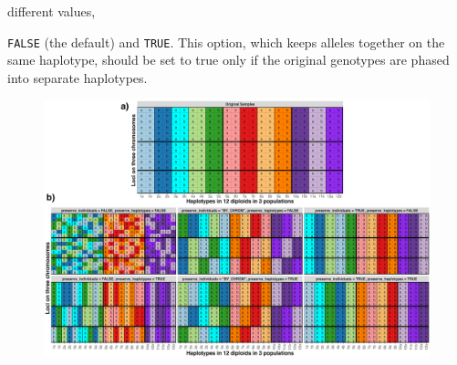 different values, {{\tt\footnotesize FALSE} (the default) and {\tt\footnotesize TRUE}. 
This option, which keeps alleles together
on the same haplotype, should be set to true only
if the original genotypes are phased into separate haplotypes.

\newcommand{\permcap}{\footnotesize An illustration of how \gscramble{} permutes data under
different options.  {\bf (a)}~A picture
representing an original data set of $N=12$ diploids sampled from three populations and typed at $L=15$ markers.
Different colors represent different sampled individuals. Individuals 1--5 are shades of blue and green, indicating that they
are from a single population.  Individuals 6--9 are from another population, (shades of red and orange), while 10--12
are from a third population and are colored shades of violet. Thick vertical black lines separate the different
populations.  Markers are shown in rows. There are 6 markers on the first chromosome, 5 on the second, and 4 on the
third.  Each chromosome is delimited by a thick, horizontal black line. The "a" and the "b" in the colored cells denote the first and second gene copies within an individual at each marker.  It is worth noting that this representation shows a $2L \times N$ matrix,
which is the transpose of the $N\times 2L$ matrix used to supply genetic marker data to \gscramble{}. {\bf (b)}~Examples of how the {\tt\footnotesize preserve\_individuals} and {\tt\footnotesize preserve\_haplotypes} options of the {\tt\footnotesize segments2markers()}
function affect the permutation of
the genetic data of the original data set.  Panel headers show the option values while the colors and "a" and "b" values
in the colored cells show the original position of each gene copy in the original sample.  Note that permutation is always
done within the populations.  When {\tt\footnotesize preserve\_individuals = TRUE},  then just the
individuals in their entirety are permuted.  When {\tt\footnotesize preserve\_individuals = "BY\_CHROM"}, each pair
of a single chromosome within an individual remains together when permuted. When {\tt\footnotesize preserve\_individuals = FALSE}, gene copies are freely permuted between individuals.  The option {\tt\footnotesize preserve\_haplotypes = TRUE} causes each haplotype on a chromosome to be preserved
while permuting. This option should only be used when the original data set is phased.
}
\begin{figure}
\includegraphics[width=\textwidth]{figures/permutations-plot.png}

\end{figure}}
